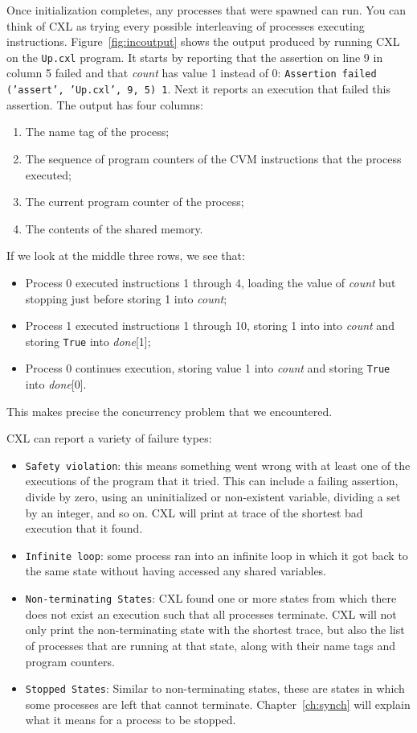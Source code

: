 \documentclass{report}
\begin{document}
Once initialization completes, any processes that were spawned can run.
You can think of CXL as trying every possible interleaving of processes executing
instructions.
Figure~\ref{fig:incoutput} shows the output produced by running CXL on the
\texttt{Up.cxl} program.
It starts by reporting that the assertion on line 9 in column 5 failed and that
\textit{count} has value 1 instead of 0:
\texttt{Assertion failed (’assert’, ’Up.cxl’, 9, 5) 1}.
Next it reports an execution that failed this assertion.  The output has
four columns:
\begin{enumerate}
\item The name tag of the process;
\item The sequence of program counters of the CVM instructions that the process executed;
\item The current program counter of the process;
\item The contents of the shared memory.
\end{enumerate}

If we look at the middle three rows, we see that:
\begin{itemize}
\item Process 0 executed instructions 1 through 4, loading the value of
\textit{count} but stopping just before storing 1 into \textit{count};
\item Process 1 executed instructions 1 through 10, storing 1 into
into \textit{count} and storing \texttt{True} into \textit{done}[1];
\item Process 0 continues execution, storing value 1 into \textit{count}
and storing \texttt{True} into \textit{done}[0].
\end{itemize}

This makes precise the concurrency problem that we encountered.

CXL can report a variety of failure types:
\begin{itemize}
\item \texttt{Safety violation}: this means something went wrong with
at least one of the executions of the program that it tried.  This
can include a failing assertion, divide by zero, using an uninitialized
or non-existent variable, dividing a set by an integer, and so on.
CXL will print at trace of the shortest bad execution that it found.
\item \texttt{Infinite loop}: some process ran into an infinite loop
in which it got back to the same state without having accessed any
shared variables.
\item \texttt{Non-terminating States}: CXL found one or more states
from which there does not exist an execution such that all processes
terminate.  CXL will not only print the non-terminating state with
the shortest trace, but also the list of processes that are running
at that state, along with their name tags and program counters.
\item \texttt{Stopped States}: Similar to non-terminating states,
these are states in which some processes are left that cannot
terminate.  Chapter~\ref{ch:synch} will explain what it means for
a process to be stopped.
\end{itemize}
\end{document}
